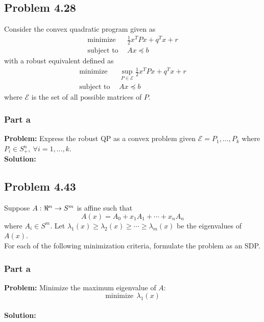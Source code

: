 \documentclass[letter]{article}
\begin{document}
\subsection{Problem 4.28}
Consider the convex quadratic program given as
\begin{equation}\label{eq:convex_quadratic_program}
	\begin{aligned}
		\text{minimize} \ \ & \frac{1}{2} x^T P x + q^T x + r\\
		\text{subject to} \ \ & Ax \preceq b
	\end{aligned}
\end{equation}
with a robust equivalent defined as
\begin{equation}\label{eq:robust_convex_quadratic_program}
	\begin{aligned}
		\text{minimize} \ \ & \sup_{P\in \mathcal{E}}{\frac{1}{2} x^T P x + q^T x + r}\\
		\text{subject to} \ \ & Ax \preceq b
	\end{aligned}
\end{equation}
where $\mathcal{E}$ is the set of all possible matrices of $P$.

\subsubsection{Part a}
\textbf{Problem:}
Express the robust QP as a convex problem given $\mathcal{E} = {P_1,\dots,P_k}$ where $P_i\in S^n_+, \ \forall i=1,\dots,k$.\\

\textbf{Solution:}







\newpage
\subsection{Problem 4.43}
Suppose $A: \real^n \to S^m$ is affine such that
\begin{equation}
	A(x) = A_0 + x_1 A_1 + \cdots + x_n A_n
\end{equation}
where $A_i \in S^m$. Let $\lambda_1(x) \geq \lambda_2(x) \geq \cdots \geq \lambda_m(x)$ be the eigenvalues of $A(x)$.\\


For each of the following minimization criteria, formulate the problem as an SDP.\\

\subsubsection{Part a}
\textbf{Problem:}
Minimize the maximum eigenvalue of $A$: $$\text{minimize} \ \ \lambda_1(x)$$\\
\textbf{Solution:}
\end{document}
